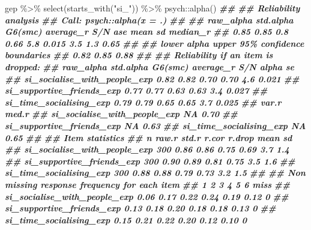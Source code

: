 \documentclass[
]{book}
\newenvironment{Shaded}{\begin{snugshade}}{\end{snugshade}}
\newcommand{\DocumentationTok}[1]{\textcolor[rgb]{0.56,0.35,0.01}{\textbf{\textit{#1}}}}
\newcommand{\FunctionTok}[1]{\textcolor[rgb]{0.00,0.00,0.00}{#1}}
\newcommand{\NormalTok}[1]{#1}
\newcommand{\SpecialCharTok}[1]{\textcolor[rgb]{0.00,0.00,0.00}{#1}}
\newcommand{\StringTok}[1]{\textcolor[rgb]{0.31,0.60,0.02}{#1}}
\begin{document}
\begin{Shaded}
\begin{Highlighting}[]
\NormalTok{gep }\SpecialCharTok{\%\textgreater{}\%} 
  \FunctionTok{select}\NormalTok{(}\FunctionTok{starts\_with}\NormalTok{(}\StringTok{"si\_"}\NormalTok{)) }\SpecialCharTok{\%\textgreater{}\%}
\NormalTok{  psych}\SpecialCharTok{::}\FunctionTok{alpha}\NormalTok{()}
\DocumentationTok{\#\# }
\DocumentationTok{\#\# Reliability analysis   }
\DocumentationTok{\#\# Call: psych::alpha(x = .)}
\DocumentationTok{\#\# }
\DocumentationTok{\#\#   raw\_alpha std.alpha G6(smc) average\_r S/N   ase mean  sd median\_r}
\DocumentationTok{\#\#       0.85      0.85     0.8      0.66 5.8 0.015  3.5 1.3     0.65}
\DocumentationTok{\#\# }
\DocumentationTok{\#\#  lower alpha upper     95\% confidence boundaries}
\DocumentationTok{\#\# 0.82 0.85 0.88 }
\DocumentationTok{\#\# }
\DocumentationTok{\#\#  Reliability if an item is dropped:}
\DocumentationTok{\#\#                              raw\_alpha std.alpha G6(smc) average\_r S/N alpha se}
\DocumentationTok{\#\# si\_socialise\_with\_people\_exp      0.82      0.82    0.70      0.70 4.6    0.021}
\DocumentationTok{\#\# si\_supportive\_friends\_exp         0.77      0.77    0.63      0.63 3.4    0.027}
\DocumentationTok{\#\# si\_time\_socialising\_exp           0.79      0.79    0.65      0.65 3.7    0.025}
\DocumentationTok{\#\#                              var.r med.r}
\DocumentationTok{\#\# si\_socialise\_with\_people\_exp    NA  0.70}
\DocumentationTok{\#\# si\_supportive\_friends\_exp       NA  0.63}
\DocumentationTok{\#\# si\_time\_socialising\_exp         NA  0.65}
\DocumentationTok{\#\# }
\DocumentationTok{\#\#  Item statistics }
\DocumentationTok{\#\#                                n raw.r std.r r.cor r.drop mean  sd}
\DocumentationTok{\#\# si\_socialise\_with\_people\_exp 300  0.86  0.86  0.75   0.69  3.7 1.4}
\DocumentationTok{\#\# si\_supportive\_friends\_exp    300  0.90  0.89  0.81   0.75  3.5 1.6}
\DocumentationTok{\#\# si\_time\_socialising\_exp      300  0.88  0.88  0.79   0.73  3.2 1.5}
\DocumentationTok{\#\# }
\DocumentationTok{\#\# Non missing response frequency for each item}
\DocumentationTok{\#\#                                 1    2    3    4    5    6 miss}
\DocumentationTok{\#\# si\_socialise\_with\_people\_exp 0.06 0.17 0.22 0.24 0.19 0.12    0}
\DocumentationTok{\#\# si\_supportive\_friends\_exp    0.13 0.18 0.20 0.18 0.18 0.13    0}
\DocumentationTok{\#\# si\_time\_socialising\_exp      0.15 0.21 0.22 0.20 0.12 0.10    0}
\end{Highlighting}
\end{Shaded}
\end{document}
